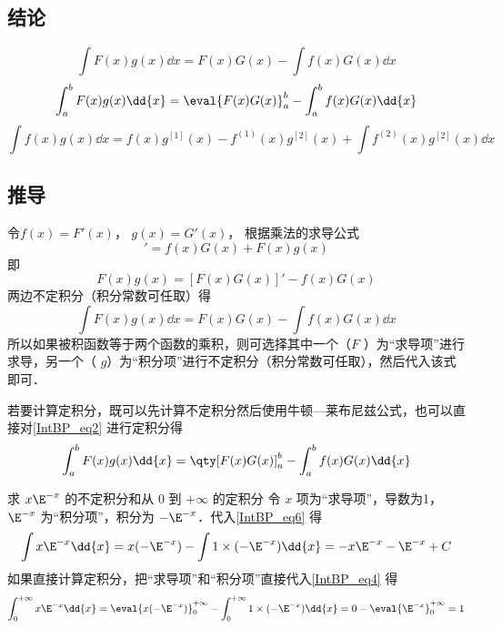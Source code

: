 

\subsection{结论}
\begin{equation}\label{IntBP_eq1}
\int F(x)g(x)\dd{x}  = F(x)G(x) - \int f(x)G(x)\dd{x}
\end{equation}
\begin{equation}
\int_a^b F(x)g(x) \dd{x}  = \eval{F(x)G(x)}_a^b - \int_a^b f(x)G(x) \dd{x}
\end{equation}
\begin{equation}
\int f(x)g(x) \dd{x}  = f(x)g^{[1]}(x) - f^{(1)}(x)g^{[2]}(x) + \int f^{(2)}(x) g^{[2]}(x) \dd{x}
\end{equation}

\subsection{推导}
令$f(x) = F'(x)$，  $g(x) = G'(x)$， 根据乘法的求导公式%
\begin{equation}
[F(x)G(x)]' = f(x)G(x) + F(x)g(x)
\end{equation}
即
\begin{equation}\label{IntBP_eq2}
F(x)g(x) = [F(x)G(x)]' - f(x)G(x)
\end{equation}
两边不定积分（积分常数可任取）得
\begin{equation}\label{IntBP_eq6}
\int F(x)g(x) \dd{x}  = F(x)G(x) - \int f(x)G(x) \dd{x}
\end{equation}
所以如果被积函数等于两个函数的乘积，则可选择其中一个（$F$ ）为“求导项”进行求导，另一个（ $g$）为“积分项”进行不定积分（积分常数可任取），然后代入该式即可．

若要计算定积分，既可以先计算不定积分然后使用牛顿—莱布尼兹公式，也可以直接对\autoref{IntBP_eq2} 进行定积分得
\begin{equation}\label{IntBP_eq4}
\int_a^b F(x)g(x) \dd{x}  = \qty[ F(x)G(x) ]_a^b - \int_a^b f(x)G(x) \dd{x}
\end{equation}

\begin{exam}{求 $x \E^{ - x}$ 的不定积分和从 $0$ 到 $+\infty$ 的定积分}
令 $x$ 项为“求导项”，导数为1， $\E^{ - x}$ 为“积分项”，积分为 $-\E^{ - x}$．代入\autoref{IntBP_eq6} 得
\begin{equation}
\int x \E^{ - x} \dd{x}  = x(-\E^{ - x}) - \int 1 \times (-\E^{ - x}) \dd{x}  =  - x \E^{ - x} - \E^{ - x} + C
\end{equation}
如果直接计算定积分，把“求导项”和“积分项”直接代入\autoref{IntBP_eq4} 得
\begin{equation}
\int_0^{+\infty} x \E^{-x} \dd{x}  = \eval{ x( - \E^{-x}) }_0^{ + \infty } - \int_0^{+\infty} 1 \times (-\E^{-x}) \dd{x}  = 0 - \eval{ \E^{-x} }_0^{+\infty} = 1
\end{equation}
\end{exam}

